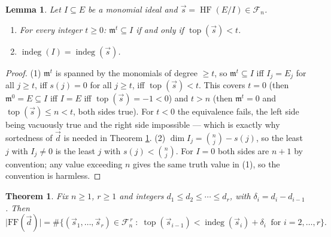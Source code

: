 \documentclass[11pt, a4paper, abstract=yes]{scrartcl}
\theoremstyle{definition}
\theoremstyle{remark}
\theoremstyle{plain}
\newtheorem{lemma}[definition]{Lemma}
\newtheorem{theorem}[definition]{Theorem}
\newcommand{\vek}[1]{\boldsymbol{#1}}
\newcommand{\indeg}{\operatorname{indeg}}
\newcommand{\tp}{\operatorname{top}}
\newcommand{\HF}{\operatorname{HF}}
\renewcommand{\vek}[1]{\vec{#1}}
\begin{document}
\begin{lemma}
Let \(I\subseteq E\) be a monomial ideal and \(\vek s=\HF(E/I)\in\mathcal F_n\).
\begin{enumerate}
\item For every integer \(t\ge0\): \(\mathfrak m^t\subseteq I\) if and only if \(\tp(\vek s)<t\).
\item \(\indeg(I)=\indeg(\vek s)\).
\end{enumerate}
\label{orgd47ba5e}
\end{lemma}

\begin{proof}
(1) \(\mathfrak m^t\) is spanned by the monomials of degree \(\ge t\), so
\(\mathfrak m^t\subseteq I\) iff \(I_j=E_j\) for all \(j\ge t\), iff \(s(j)=0\) for all \(j\ge t\),
iff \(\tp(\vek s)<t\). This covers \(t=0\) (then \(\mathfrak m^0=E\subseteq I\) iff \(I=E\) iff
\(\tp(\vek s)=-1<0\)) and \(t>n\) (then \(\mathfrak m^t=0\) and \(\tp(\vek s)\le n<t\), both sides true). For
\(t<0\) the equivalence fails, the left side being vacuously true and the right side impossible ---
which is exactly why sortedness of \(\vek d\) is needed in Theorem \ref{org490b051}.
(2) \(\dim I_j=\binom nj-s(j)\), so the least \(j\) with \(I_j\ne0\) is the least \(j\) with
\(s(j)<\binom nj\). For \(I=0\) both sides are \(n+1\) by convention; any value exceeding \(n\) gives
the same truth value in (1), so the convention is harmless.
\end{proof}

\begin{theorem}
Fix \(n\ge1\), \(r\ge1\) and integers \(d_1\le d_2\le\cdots\le d_r\), with
\(\delta_i=d_i-d_{i-1}\). Then
\[
  \lvert\mathrm{FF}(\vek d)\rvert=\#\bigl\lbrace(\vek s_1,\dots,\vek s_r)\in\mathcal F_n^{\,r}\;:\;
  \tp(\vek s_{i-1})<\indeg(\vek s_i)+\delta_i\ \text{ for } i=2,\dots,r\bigr\rbrace .
\]
\label{org490b051}
\end{theorem}
\end{document}
